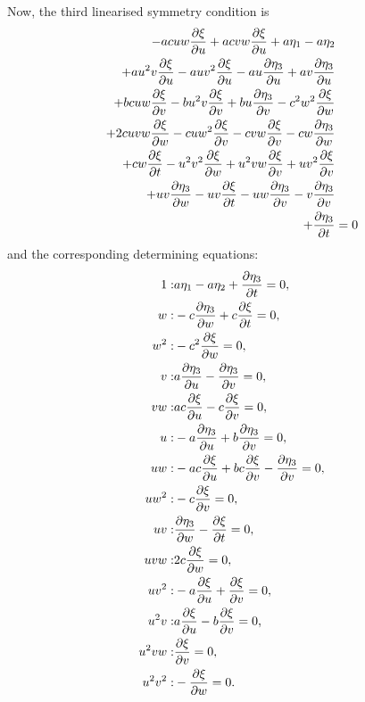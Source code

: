 Now, the third linearised symmetry condition is
\begin{align}
  - a c u w \pdv{\xi}{u} + a c v w \pdv{\xi}{u} + a \eta_1 - a \eta_2&\nonumber\\
  + a u^{2} v \pdv{\xi}{u} - a u v^{2} \pdv{\xi}{u} - a u \pdv{\eta_3}{u} + a v \pdv{\eta_3}{u}&\nonumber\\
  + b c u w \pdv{\xi}{v} - b u^{2} v \pdv{\xi}{v} + b u \pdv{\eta_3}{v} - c^{2} w^{2} \pdv{\xi}{w}&\nonumber\\
  + 2 c u v w \pdv{\xi}{w} - c u w^{2} \pdv{\xi}{v} - c v w \pdv{\xi}{v} - c w \pdv{\eta_3}{w}&\nonumber\\
  + c w \pdv{\xi}{t} - u^{2} v^{2} \pdv{\xi}{w} + u^{2} v w \pdv{\xi}{v} + u v^{2} \pdv{\xi}{v}&\nonumber\\
  + u v \pdv{\eta_3}{w} - u v \pdv{\xi}{t} - u w \pdv{\eta_3}{v} - v \pdv{\eta_3}{v}&\nonumber\\
  + \pdv{\eta_3}{t}&=0\label{eq:Lorenz_lin_sym_3}
\end{align}
and the corresponding determining equations:
\begin{align}
1:&a \eta_1 - a \eta_2 + \pdv{\eta_3}{t}=0,\\
w:&- c \pdv{\eta_3}{w} + c \pdv{\xi}{t}=0,\\
w^{2}:&- c^{2} \pdv{\xi}{w}=0,\\
v:&a \pdv{\eta_3}{u} - \pdv{\eta_3}{v}=0,\\
v w:&a c \pdv{\xi}{u} - c \pdv{\xi}{v}=0,\\
u:&- a \pdv{\eta_3}{u} + b \pdv{\eta_3}{v}=0,\\
u w:&- a c \pdv{\xi}{u} + b c \pdv{\xi}{v} - \pdv{\eta_3}{v}=0,\\
u w^{2}:&- c \pdv{\xi}{v}=0,\\
u v:&\pdv{\eta_3}{w} - \pdv{\xi}{t}=0,\\
u v w:&2 c \pdv{\xi}{w}=0,\\
u v^{2}:&- a \pdv{\xi}{u} + \pdv{\xi}{v}=0,\\
u^{2} v:&a \pdv{\xi}{u} - b \pdv{\xi}{v}=0,\\
u^{2} v w:&\pdv{\xi}{v}=0,\\
u^{2} v^{2}:&- \pdv{\xi}{w}=0.
\end{align}

